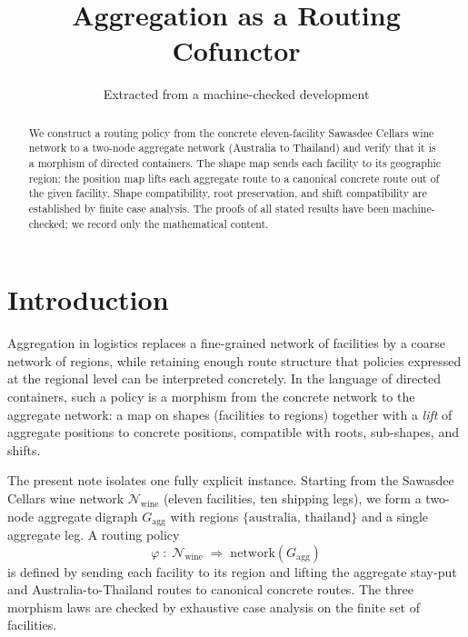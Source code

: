 \documentclass[11pt,a4paper]{article}
\title{Aggregation as a Routing Cofunctor}
\author{Extracted from a machine-checked development}
\date{}
\theoremstyle{plain}
\theoremstyle{definition}
\begin{document}
\maketitle

\begin{abstract}
We construct a routing policy from the concrete eleven-facility Sawasdee
Cellars wine network to a two-node aggregate network (Australia to Thailand)
and verify that it is a morphism of directed containers. The shape map sends
each facility to its geographic region; the position map lifts each aggregate
route to a canonical concrete route out of the given facility. Shape
compatibility, root preservation, and shift compatibility are established by
finite case analysis. The proofs of all stated results have been
machine-checked; we record only the mathematical content.
\end{abstract}

\tableofcontents
\bigskip

\section{Introduction}

Aggregation in logistics replaces a fine-grained network of facilities by a
coarse network of regions, while retaining enough route structure that
policies expressed at the regional level can be interpreted concretely. In the
language of directed containers, such a policy is a morphism from the concrete
network to the aggregate network: a map on shapes (facilities to regions)
together with a \emph{lift} of aggregate positions to concrete positions,
compatible with roots, sub-shapes, and shifts.

The present note isolates one fully explicit instance. Starting from the
Sawasdee Cellars wine network $\mathcal{N}_{\mathrm{wine}}$ (eleven facilities,
ten shipping legs), we form a two-node aggregate digraph $G_{\mathrm{agg}}$
with regions $\{\mathrm{australia},\, \mathrm{thailand}\}$ and a single
aggregate leg. A routing policy
\[
  \varphi \;:\;
  \mathcal{N}_{\mathrm{wine}}
  \;\Longrightarrow\;
  \mathrm{network}(G_{\mathrm{agg}})
\]
is defined by sending each facility to its region and lifting the aggregate
stay-put and Australia-to-Thailand routes to canonical concrete routes. The
three morphism laws are checked by exhaustive case analysis on the finite set
of facilities.
\end{document}
